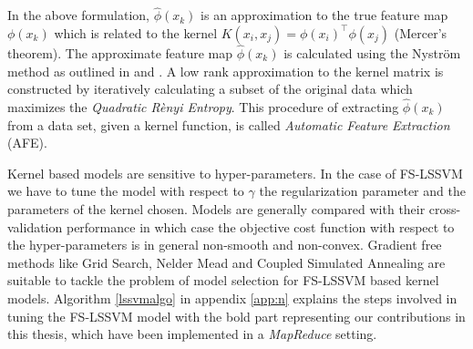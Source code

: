 In the above formulation, $\hat{\phi}(x_k)$ is an approximation to the true feature map $\phi(x_k)$ which is related to the kernel $K(x_i, x_j) = \phi(x_i)^{\intercal} \phi(x_j)$ (Mercer's theorem). The approximate feature map $\hat{\phi}(x_k)$ is calculated using the Nystr\"om method as outlined in \cite{DeBrabanter2010,Mall2015} and \cite{Mall2013}. A low rank approximation to the kernel matrix is constructed by iteratively calculating a subset of the original data which maximizes the \textit{Quadratic R\`enyi Entropy}. This procedure of extracting $\hat{\phi}(x_k)$ from a data set, given a kernel function, is called \textit{Automatic Feature Extraction} (AFE).

Kernel based models are sensitive to hyper-parameters. In the case of FS-LSSVM we have to tune the model with respect to $\gamma$ the regularization parameter and the parameters of the kernel chosen. Models are generally compared with their cross-validation performance in which case the objective cost function with respect to the hyper-parameters is in general non-smooth and non-convex. Gradient free methods like Grid Search, Nelder Mead \cite{Nelder1965} and Coupled Simulated Annealing \cite{Xavier-De-Souza2010} are suitable to tackle the problem of model selection for FS-LSSVM based kernel models. Algorithm \ref{lssvmalgo} in appendix \ref{app:n} explains the steps involved in tuning the FS-LSSVM model with the bold part representing our contributions in this thesis, which have been implemented in a \textit{MapReduce} setting.
